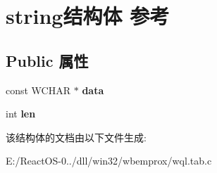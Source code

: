 \hypertarget{structstring}{}\section{string结构体 参考}
\label{structstring}
\subsection*{Public 属性}
\begin{DoxyCompactItemize}
\item 
\mbox{\label{structstring_ab8ba731d59308b343e51a5bf362431ee}} 
const W\+C\+H\+AR $\ast$ {\bfseries data}
\item 
\mbox{\label{structstring_a3a4411e06b81944a7b94a744adaa4d15}} 
int {\bfseries len}
\end{DoxyCompactItemize}


该结构体的文档由以下文件生成\+:\begin{DoxyCompactItemize}
\item 
E\+:/\+React\+O\+S-\/0../dll/win32/wbemprox/wql.\+tab.\+c\end{DoxyCompactItemize}
